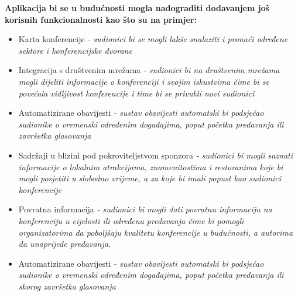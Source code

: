 		\textbf{Aplikacija bi se u budućnosti mogla nadograditi dodavanjem još korisnih funkcionalnosti kao što su na primjer:}
		\begin{itemize}
			\item Karta konferencije
			\textit{- sudionici bi se mogli lakše snalaziti i pronaći određene sektore i konferencijske dvorane}
			\item Integracija s društvenim mrežama
			\textit{- sudionici bi na društvenim mrežama mogli dijeliti informacije o konferenciji i svojim iskustvima čime bi se povećala vidljivost konferencije i time bi se privukli novi sudionici}
			\item Automatizirane obavijesti
			\textit{- sustav obavijesti automatski bi podsjećao sudionike o vremenski određenim događajima, poput početka predavanja ili završetka glasovanja}
			\item Sadržaji u blizini pod pokroviteljstvom sponzora
			\textit{- sudionici bi mogli saznati informacije o lokalnim atrakcijama, znamenitostima i restoranima koje bi mogli posjetiti u slobodno vrijeme, a za koje bi imali popust kao sudionici konferencije}
			\item Povratna informacija
			\textit{- sudionici bi mogli dati povratnu informaciju na konferenciju u cijelosti ili određena predavanja čime bi pomogli organizatorima da poboljšaju kvalitetu konferencije u budućnosti, a autorima da unaprijede predavanja.}
			\item Automatizirane obavijesti
			\textit{- sustav obavijesti automatski bi podsjećao sudionike o vremenski određenim događajima, poput početka predavanja ili skorog završetka glasovanja}
		\end{itemize}
		

